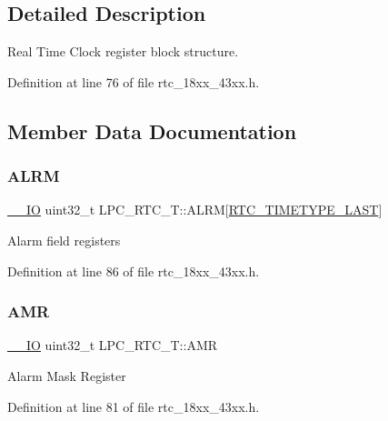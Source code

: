 \subsection{Detailed Description}
Real Time Clock register block structure. 

Definition at line 76 of file rtc\+\_\+18xx\+\_\+43xx.\+h.



\subsection{Member Data Documentation}
\mbox{\label{struct_l_p_c___r_t_c___t_abeb0bd5d52ee9f40f515b9b007c7a832}} 
\subsubsection{\texorpdfstring{A\+L\+RM}{ALRM}}
{\footnotesize\ttfamily \hyperlink{core__sc300_8h_aec43007d9998a0a0e01faede4133d6be}{\+\_\+\+\_\+\+IO} uint32\+\_\+t L\+P\+C\+\_\+\+R\+T\+C\+\_\+\+T\+::\+A\+L\+RM\mbox{[}\hyperlink{group___r_t_c__18_x_x__43_x_x_gga8144898fe628404d396db06dc8aac0e0a0d4fafef57b6ef363f9a0875ff339cad}{R\+T\+C\+\_\+\+T\+I\+M\+E\+T\+Y\+P\+E\+\_\+\+L\+A\+ST}\mbox{]}}

Alarm field registers 

Definition at line 86 of file rtc\+\_\+18xx\+\_\+43xx.\+h.

\mbox{\label{struct_l_p_c___r_t_c___t_af8b21ae5aa8bedcb0a1dd918678ee389}} 
\subsubsection{\texorpdfstring{A\+MR}{AMR}}
{\footnotesize\ttfamily \hyperlink{core__sc300_8h_aec43007d9998a0a0e01faede4133d6be}{\+\_\+\+\_\+\+IO} uint32\+\_\+t L\+P\+C\+\_\+\+R\+T\+C\+\_\+\+T\+::\+A\+MR}

Alarm Mask Register 

Definition at line 81 of file rtc\+\_\+18xx\+\_\+43xx.\+h.

\mbox{\label{struct_l_p_c___r_t_c___t_ade5b98ca9e6ea8af2fd91e8a4f20503b}} 
